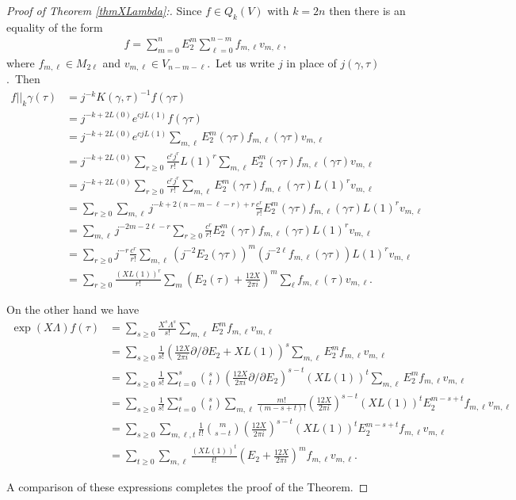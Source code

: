 \documentclass[12pt]{amsart}
\theoremstyle{plain}
\theoremstyle{definition}
\theoremstyle{remark}
\begin{document}
\begin{proof}[Proof of Theorem \ref{thmXLambda}:]
Since $f\in Q_k(V)$ with $k=2n$ then there is an equality of the form
\begin{eqnarray}\label{fdef}
f=\sum_{m=0}^n E_2^m\sum_{\ell=0}^{n-m} f_{m,\ell}v_{m, \ell},
\end{eqnarray}
where $f_{m, \ell}\in M_{2\ell}$ and $v_{m, \ell}\in V_{n-m-\ell}$.\ Let us write $j$ in place of $j(\gamma, \tau)$.\ Then
\begin{align*}
  f||_k\gamma(\tau) &=j^{-k}K(\gamma, \tau)^{-1}f(\gamma\tau)\\
  &=j^{-k+2L(0)}e^{cjL(1)}f(\gamma\tau)\\
  &=j^{-k+2L(0)}e^{cjL(1)}\sum_{m, \ell}E_2^m(\gamma\tau)f_{m, \ell}(\gamma\tau)v_{m, \ell}\\
  &=j^{-k+2L(0)}\sum_{r\geq 0} \frac{c^rj^r}{r!}L(1)^r\sum_{m, \ell}E_2^m(\gamma\tau)f_{m, \ell}(\gamma\tau)v_{m, \ell}\\
  &=j^{-k+2L(0)}\sum_{r\geq 0} \frac{c^rj^r}{r!}\sum_{m, \ell}E_2^m(\gamma\tau)f_{m, \ell}(\gamma\tau)L(1)^rv_{m, \ell}\\
  &=\sum_{r\geq0}\sum_{m, \ell}j^{-k+2(n-m-\ell-r)+r}\frac{c^r}{r!}E_2^m(\gamma\tau)f_{m, \ell}(\gamma\tau)L(1)^rv_{m, \ell}\\
  &=\sum_{m, \ell}j^{-2m-2\ell-r}\sum_{r\geq 0} \frac{c^r}{r!}E_2^m(\gamma\tau)f_{m, \ell}(\gamma\tau)L(1)^rv_{m, \ell}\\
  &=\sum_{r\geq0}j^{-r} \frac{c^r}{r!}\sum_{m, \ell}(j^{-2}E_2(\gamma\tau))^m(j^{-2\ell}f_{m, \ell}(\gamma\tau))L(1)^rv_{m, \ell}\\
  &=\sum_{r\geq0} \frac{(XL(1))^r}{r!}\sum_m \left(E_2(\tau)+\frac{12X}{2\pi i}\right)^m \sum_{\ell}f_{m, \ell}(\tau)v_{m, \ell}.
\end{align*}

On the other hand we have
\begin{align*}
\exp(X\Lambda)f(\tau)&=\sum_{s\geq0} \frac{X^s\Lambda^s}{s!}
\sum_{m, \ell} E_2^mf_{m, \ell} v_{m, \ell}\\
&=\sum_{s\geq0} \frac{1}{s!}\left(\frac{12X}{2\pi i}\partial/\partial E_2 +XL(1)\right)^s\sum_{m, \ell} E_2^mf_{m, \ell} v_{m, \ell}\\
&=\sum_{s\geq0} \frac{1}{s!}\sum_{t=0}^s \binom{s}{t}\left(\frac{12X}{2\pi i}\partial/\partial E_2 \right)^{s-t}
(XL(1))^{t}\sum_{m, \ell} E_2^mf_{m, \ell} v_{m, \ell}\\
&=\sum_{s\geq0} \frac{1}{s!}\sum_{t=0}^s \binom{s}{t} \sum_{m, \ell}\frac{m!}{(m-s+t)!}\left(\frac{12X}{2\pi i}\right)^{s-t}
(XL(1))^{t}E_2^{m-s+t}f_{m, \ell} v_{m, \ell}\\
&=\sum_{s\geq0}\sum_{m, \ell, t}\frac{1}{t!}\binom{m}{s-t}
\left(\frac{12X}{2\pi i}\right)^{s-t}(XL(1))^{t}E_2^{m-s+t}f_{m, \ell} v_{m, \ell}\\
&=\sum_{t\geq0}\sum_{m, \ell}\frac{(XL(1))^t}{t!}
\left(E_2 +\frac{12X}{2\pi i}    \right)^m f_{m, \ell}v_{m, \ell}.
\end{align*}

A comparison of these expressions completes the  proof of the
Theorem.
\end{proof}
\end{document}
